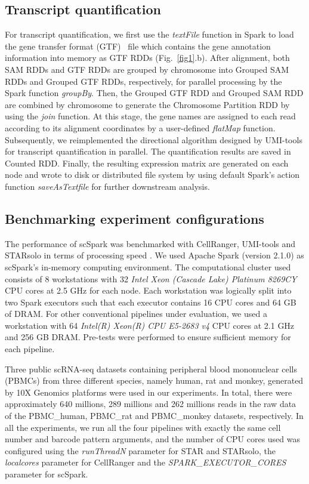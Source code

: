 \documentclass[conference]{IEEEtran}
\begin{document}
\subsection{Transcript quantification}
For transcript quantification, we first use the \textit{textFile} function in Spark to load the gene transfer format (GTF)~\cite{breese2013ngsutils} file which contains the gene annotation information into memory as GTF RDDs (Fig.~\ref{fig1}.b). 
After alignment, both SAM RDDs and GTF RDDs are grouped by chromosome into Grouped SAM RDDs and Grouped GTF RDDs, respectively, for parallel processing by the Spark function \textit{groupBy}. 
Then, the Grouped GTF RDD and Grouped SAM RDD are combined by chromosome to generate the Chromosome Partition RDD by using the \textit{join} function.
At this stage, the gene names are assigned to each read according to its alignment coordinates by a user-defined \textit{flatMap} function. 
Subsequently, we reimplemented the directional algorithm designed by UMI-tools for transcript quantification in parallel. The quantification results are saved in Counted RDD.
Finally, the resulting expression matrix are generated on each node and wrote to disk or distributed file system by using default Spark's action function \textit{saveAsTextfile} for further downstream analysis. 

\subsection{Benchmarking experiment configurations}
The performance of scSpark was benchmarked with CellRanger, UMI-tools and STARsolo in terms of processing speed . 
We used Apache Spark (version 2.1.0) as scSpark's in-memory computing environment.
The computational cluster used consists of 8 workstations with 32 \textit{Intel Xeon (Cascade Lake) Platinum 8269CY} CPU cores at 2.5 GHz for each node. 
Each workstation was logically split into two Spark executors such that each executor contains 16 CPU cores and 64 GB of DRAM.
For other conventional pipelines under evaluation, we used a workstation with 64 \textit{Intel(R) Xeon(R) CPU E5-2683 v4} CPU cores at 2.1 GHz and 256 GB DRAM. Pre-tests were performed to ensure sufficient memory for each pipeline.

Three public scRNA-seq datasets containing peripheral blood mononuclear cells (PBMCs) from three different species, namely human, rat and monkey, generated by 10X Genomics platforms were used in our experiments. 
In total, there were approximately 640 millions, 289 millions and 262 millions reads in the raw data of the PBMC\_human, PBMC\_rat and PBMC\_monkey datasets, respectively. 
In all the experiments, we run all the four pipelines with exactly the same cell number and barcode pattern arguments, and the number of CPU cores used was configured using the \textit{runThreadN} parameter for STAR and STARsolo, the \textit{localcores} parameter for CellRanger and the \textit{SPARK\_EXECUTOR\_CORES} parameter for scSpark.
\end{document}
